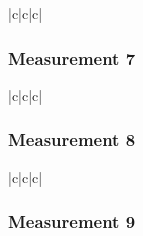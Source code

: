 \documentclass[a4paper]{article}
\makeatletter
\let\mcnewpage=\newpage
\newcommand{\TrickSupertabularIntoMulticols}{%
  \renewcommand\newpage{%
    \if@firstcolumn
      \hrule width\linewidth height0pt
      \columnbreak
    \else
      \mcnewpage
    \fi
  }%
}
\makeatother
\begin{document}
\begin{multicols}{3}

  \TrickSupertabularIntoMulticols

  \begin{supertabular}{|c|c|c|}
  \end{supertabular}

\end{multicols}

\pagebreak

\subsubsection*{Measurement 7}

\begin{multicols}{3}

  \TrickSupertabularIntoMulticols

  \begin{supertabular}{|c|c|c|}
  \end{supertabular}

\end{multicols}

\pagebreak

\subsubsection*{Measurement 8}

\begin{multicols}{3}

  \TrickSupertabularIntoMulticols

  \begin{supertabular}{|c|c|c|}
  \end{supertabular}

\end{multicols}

\pagebreak

\subsubsection*{Measurement 9}
\end{document}
